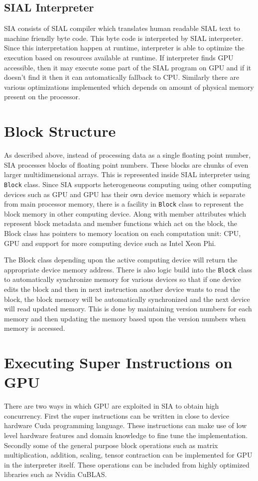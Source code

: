 \subsection{SIAL Interpreter}
SIA consists of SIAL compiler which translates human readable SIAL text to
machine friendly byte code. This byte code is interpreted by SIAL interpreter.
Since this interpretation happen at runtime, interpreter is able to optimize the
execution based on resources available at runtime. If interpreter finds GPU
accessible, then it may execute some part of the SIAL program on GPU and if it
doesn't find it then it can automatically fallback to CPU. Similarly there are
various optimizations implemented which depends on amount of physical memory
present on the processor.

\section{Block Structure}
As described above, instead of processing data as a single floating point
number, SIA processes blocks of floating point numbers. These blocks are chunks
of even larger multidimensional arrays. This is represented inside SIAL
interpreter using \texttt{Block} class. Since SIA supports heterogeneous computing
using other computing devices such as GPU and GPU has their own device memory
which is separate from main processor memory, there is a facility in
\texttt{Block} class to represent the block memory in other
computing device. Along with member attributes which represent block metadata
and member functions which act on the block, the Block class has pointers to
memory location on each computation unit: CPU, GPU and support for more
computing device such as Intel Xeon Phi.

The Block class depending upon the active computing device will return the
appropriate device memory address. There is also logic build into the \texttt{Block}
class to automatically synchronize memory for various devices so that if one
device edits the block and then in next instruction another device wants
to read the block, the block memory will be automatically synchronized and the
next device will read updated memory. This is done by maintaining version numbers
for each memory and then updating the memory based upon the version numbers when
memory is accessed.

\section{Executing Super Instructions on GPU}
There are two ways in which GPU are exploited in SIA to obtain high concurrency.
First the super instructions can be written in close to device hardware Cuda
programming language. These instructions can make use of low level hardware
features and domain knowledge to fine tune the implementation. Secondly some of
the general purpose block operations such as matrix multiplication, addition,
scaling, tensor contraction can be implemented for GPU in the interpreter
itself. These operations can be included from highly optimized libraries such as
Nvidia CuBLAS.


